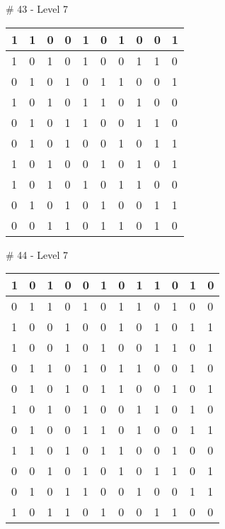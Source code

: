 \smallskip

\# 43 - Level 7 \newline
\begin{tabular}{|m{\collen}|m{\collen}|m{\collen}|m{\collen}|m{\collen}|m{\collen}|m{\collen}|m{\collen}|m{\collen}|m{\collen}|}
\hline
  1 & 1 & 0 & 0 & 1 & 0 & 1 & 0 & 0 & 1 \\
\hline
  1 & 0 & 1 & 0 & 1 & 0 & 0 & 1 & 1 & 0 \\
\hline
  0 & 1 & 0 & 1 & 0 & 1 & 1 & 0 & 0 & 1 \\
\hline
  1 & 0 & 1 & 0 & 1 & 1 & 0 & 1 & 0 & 0 \\
\hline
  0 & 1 & 0 & 1 & 1 & 0 & 0 & 1 & 1 & 0 \\
\hline
  0 & 1 & 0 & 1 & 0 & 0 & 1 & 0 & 1 & 1 \\
\hline
  1 & 0 & 1 & 0 & 0 & 1 & 0 & 1 & 0 & 1 \\
\hline
  1 & 0 & 1 & 0 & 1 & 0 & 1 & 1 & 0 & 0 \\
\hline
  0 & 1 & 0 & 1 & 0 & 1 & 0 & 0 & 1 & 1 \\
\hline
  0 & 0 & 1 & 1 & 0 & 1 & 1 & 0 & 1 & 0 \\
\hline
\end{tabular}


\smallskip

\# 44 - Level 7 \newline
\begin{tabular}{|m{\collen}|m{\collen}|m{\collen}|m{\collen}|m{\collen}|m{\collen}|m{\collen}|m{\collen}|m{\collen}|m{\collen}|m{\collen}|m{\collen}|}
\hline
  1 & 0 & 1 & 0 & 0 & 1 & 0 & 1 & 1 & 0 & 1 & 0 \\
\hline
  0 & 1 & 1 & 0 & 1 & 0 & 1 & 1 & 0 & 1 & 0 & 0 \\
\hline
  1 & 0 & 0 & 1 & 0 & 0 & 1 & 0 & 1 & 0 & 1 & 1 \\
\hline
  1 & 0 & 0 & 1 & 0 & 1 & 0 & 0 & 1 & 1 & 0 & 1 \\
\hline
  0 & 1 & 1 & 0 & 1 & 0 & 1 & 1 & 0 & 0 & 1 & 0 \\
\hline
  0 & 1 & 0 & 1 & 0 & 1 & 1 & 0 & 0 & 1 & 0 & 1 \\
\hline
  1 & 0 & 1 & 0 & 1 & 0 & 0 & 1 & 1 & 0 & 1 & 0 \\
\hline
  0 & 1 & 0 & 0 & 1 & 1 & 0 & 1 & 0 & 0 & 1 & 1 \\
\hline
  1 & 1 & 0 & 1 & 0 & 1 & 1 & 0 & 0 & 1 & 0 & 0 \\
\hline
  0 & 0 & 1 & 0 & 1 & 0 & 1 & 0 & 1 & 1 & 0 & 1 \\
\hline
  0 & 1 & 0 & 1 & 1 & 0 & 0 & 1 & 0 & 0 & 1 & 1 \\
\hline
  1 & 0 & 1 & 1 & 0 & 1 & 0 & 0 & 1 & 1 & 0 & 0 \\
\hline
\end{tabular}


